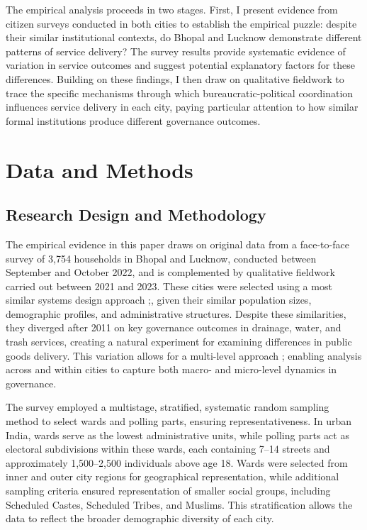 The empirical analysis proceeds in two stages. First, I present evidence from citizen surveys conducted in both cities to establish the empirical puzzle: despite their similar institutional contexts, do Bhopal and Lucknow demonstrate different patterns of service delivery? The survey results provide systematic evidence of variation in service outcomes and suggest potential explanatory factors for these differences. Building on these findings, I then draw on qualitative fieldwork to trace the specific mechanisms through which bureaucratic-political coordination influences service delivery in each city, paying particular attention to how similar formal institutions produce different governance outcomes.


\section{Data and Methods}



\subsection{Research Design and Methodology}

The empirical evidence in this paper draws on original data from a face-to-face survey of 3,754 households in Bhopal and Lucknow, conducted between September and October 2022, and is complemented by qualitative fieldwork carried out between 2021 and 2023. These cities were selected using a most similar systems design approach 
\citep{przeworski_logic_1970};\citep{anckar_applicability_2008}, given their similar population sizes, demographic profiles, and administrative structures. Despite these similarities, they diverged after 2011 on key governance outcomes in drainage, water, and trash services, creating a natural experiment for examining differences in public goods delivery. This variation allows for a multi-level approach \citep{charles_comparative_2014}; \citep{roberts_joop_handbook_2011} enabling analysis across and within cities to capture both macro- and micro-level dynamics in governance.

The survey employed a multistage, stratified, systematic random sampling method to select wards and polling parts, ensuring representativeness. In urban India, wards serve as the lowest administrative units, while polling parts act as electoral subdivisions within these wards, each containing 7–14 streets and approximately 1,500–2,500 individuals above age 18. Wards were selected from inner and outer city regions for geographical representation, while additional sampling criteria ensured representation of smaller social groups, including Scheduled Castes, Scheduled Tribes, and Muslims. This stratification allows the data to reflect the broader demographic diversity of each city.


